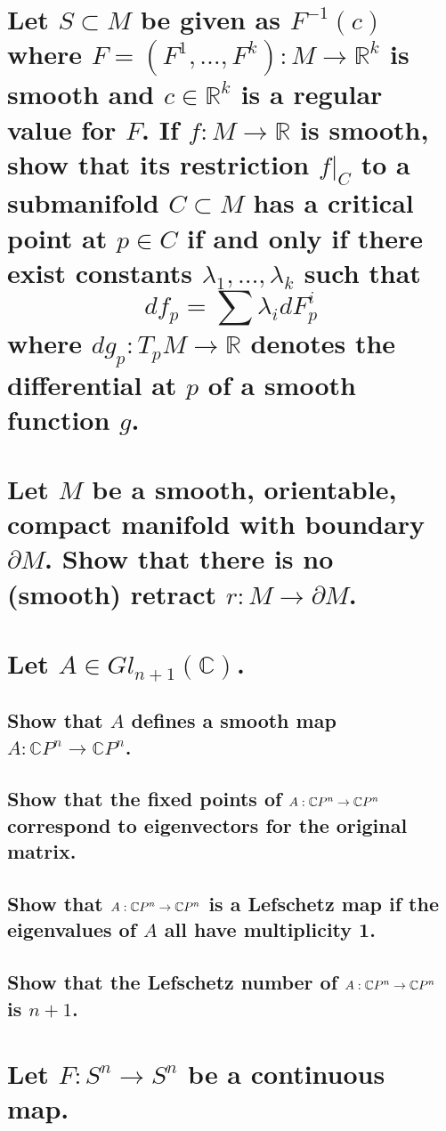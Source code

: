 \documentclass[10pt]{article}
\begin{document}
\section{Let $S \subset M$ be given as $F^{-1} (c)$ where $F = (F^1 , \dots, F^k) : M \to
  \mathbb{R}^k$ is smooth and $c \in \mathbb{R}^k$ is a regular value for $F$. If $f: M \to
  \mathbb{R}$ is smooth, show that its restriction $f|_C$ to a submanifold $C \subset M$ has a
  critical point at $p \in C$ if and only if there exist constants $\lambda_1, \dots, \lambda_k$
  such that
  $$df_p = \sum \lambda_i dF_p^i$$
  where $dg_p : T_p M \to \mathbb{R}$ denotes the differential at $p$ of a smooth function $g$.}

\section{Let $M$ be a smooth, orientable, compact manifold with boundary $\partial M$. Show that
  there is no (smooth) retract $r: M \to \partial M$. }

\section{Let $A \in Gl_{n+1}(\mathbb{C})$.}

\subsection{Show that $A$ defines a smooth map $A: \mathbb{C}P^n \to \mathbb{C}P^n$.}

\subsection{Show that the fixed points of $A: \mathbb{C}P^{n} \to \mathbb{C}P^{n}$ correspond to eigenvectors for the
  original matrix.}

\subsection{Show that $A : \mathbb{C}P^{n} \to \mathbb{C}P^{n}$ is a Lefschetz map if the eigenvalues of $A$ all have
  multiplicity 1.}

\subsection{Show that the Lefschetz number of $A: \mathbb{C}P^{n} \to \mathbb{C}P^{n}$ is $n+1$. }

\section{Let $F: S^n \to S^n$ be a continuous map.}
\end{document}
